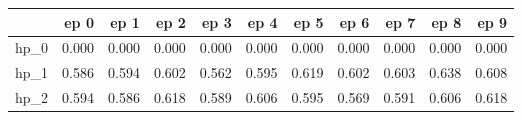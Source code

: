 \begin{tabular}{lrrrrrrrrrr}
\toprule
{} &   ep 0 &   ep 1 &   ep 2 &   ep 3 &   ep 4 &   ep 5 &   ep 6 &   ep 7 &   ep 8 &   ep 9 \\
\midrule
hp\_0 &  0.000 &  0.000 &  0.000 &  0.000 &  0.000 &  0.000 &  0.000 &  0.000 &  0.000 &  0.000 \\
hp\_1 &  0.586 &  0.594 &  0.602 &  0.562 &  0.595 &  0.619 &  0.602 &  0.603 &  0.638 &  0.608 \\
hp\_2 &  0.594 &  0.586 &  0.618 &  0.589 &  0.606 &  0.595 &  0.569 &  0.591 &  0.606 &  0.618 \\
\bottomrule
\end{tabular}
